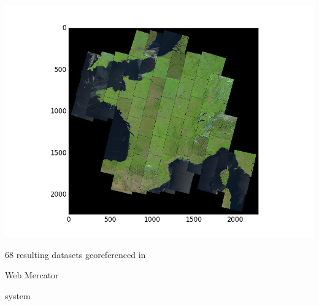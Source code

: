\documentclass[c]{beamer}
\begin{document}
\begin{frame}
\begin{columns}[t]
\begin{column}{0.50\textwidth}
\begin{overlayarea}{\linewidth}{4cm}
  \centering\vfill
  \includegraphics[scale=0.25]{images/importing/france-covering.png}
\end{overlayarea}
\begin{overlayarea}{\linewidth}{1cm}
  \centering
  \scriptsize 68 resulting datasets georeferenced in \begin{itshape}Web Mercator\end{itshape} system\par
\end{overlayarea}
\end{column}
\end{columns}

\end{frame}
\end{document}
